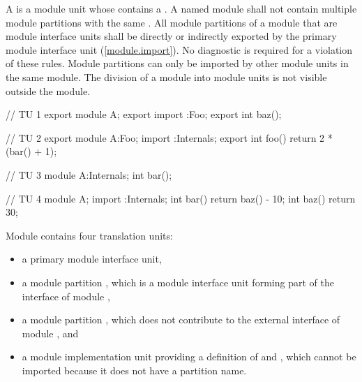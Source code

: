 \begin{std.txt}
\pnum
A  is
a module unit whose  contains
a .
A named module shall not contain multiple module partitions with
the same %
.
All module partitions of a module
that are module interface units
shall be directly or indirectly exported
by the primary module interface unit (\ref{module.import}).
No diagnostic is required for a violation of these rules.
\enternote
Module partitions can only be imported by
other module units in the same module.
The division of a module into module units
is not visible outside the module.
\exitnote

\begin{after}\color{addclr}
\pnum
\begin{example}
\begin{codeblock}
// TU 1
export module A;
export import :Foo;
export int baz();
\end{codeblock}

\begin{codeblock}
// TU 2
export module A:Foo;
import :Internals;
export int foo() { return 2 * (bar() + 1); }
\end{codeblock}

\begin{codeblock}
// TU 3
module A:Internals;
int bar();
\end{codeblock}

\begin{codeblock}
// TU 4
module A;
import :Internals;
int bar() { return baz() - 10; }
int baz() { return 30; }
\end{codeblock}

Module  contains four translation units:
\begin{itemize}
\item a primary module interface unit,
\item a module partition , which is a module interface unit
forming part of the interface of module ,
\item a module partition , which does not contribute
to the external interface of module , and
\item a module implementation unit providing
a definition of  and ,
which cannot be imported because
it does not have a partition name.
\end{itemize}
\end{example}
\end{after}


\end{std.txt}
